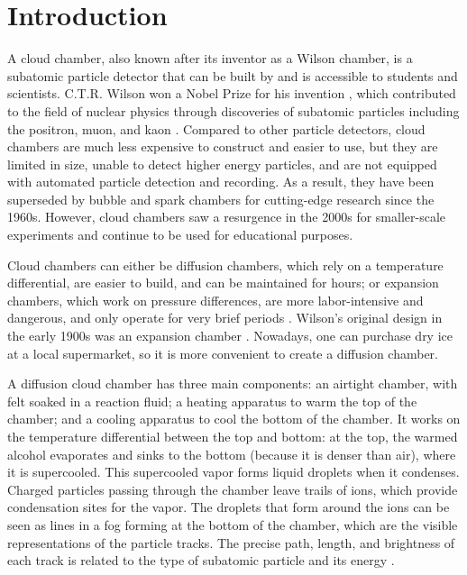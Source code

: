 \documentclass[notitlepage]{article}
\begin{document}
\clearpage
\section{Introduction}

A cloud chamber, also known after its inventor as a Wilson chamber, is a subatomic particle detector that can be built by and is accessible to students and scientists.  C.T.R. Wilson won a Nobel Prize for his invention \cite{nobelcloud}, which contributed to the field of nuclear physics through discoveries of subatomic particles including the positron, muon, and kaon \cite{hyperphysics}.  Compared to other particle detectors, cloud chambers are much less expensive to construct and easier to use, but they are limited in size, unable to detect higher energy particles, and are not equipped with automated particle detection and recording.  As a result, they have been superseded by bubble and spark chambers for cutting-edge research since the 1960s. However, cloud chambers saw a resurgence in the 2000s for smaller-scale experiments and continue to be used for educational purposes. 

Cloud chambers can either be diffusion chambers, which rely on a temperature differential, are easier to build, and can be maintained for hours; or expansion chambers, which work on pressure differences, are more labor-intensive and dangerous, and only operate for very brief periods \cite{chamberdesign}.  Wilson's original design in the early 1900s was an expansion chamber \cite{1946}.  Nowadays, one can purchase dry ice at a local supermarket, so it is more convenient to create a diffusion chamber.

A diffusion cloud chamber has three main components: an airtight chamber, with felt soaked in a reaction fluid; a heating apparatus to warm the top of the chamber; and a cooling apparatus to cool the bottom of
the chamber.  It works on the temperature differential between the top and bottom: at the top, the warmed alcohol evaporates and sinks to the bottom (because it is denser than air), where it is supercooled. This supercooled vapor forms liquid
droplets when it condenses. Charged particles passing through the chamber leave trails of ions, which provide condensation sites for the vapor.  The droplets that form around the ions can be seen as lines in a fog forming at the bottom of the chamber, which are the visible representations of the particle tracks.  The precise path, length, and brightness of each track is related to the type of subatomic particle and its energy \cite{symmetry}.
\end{document}
